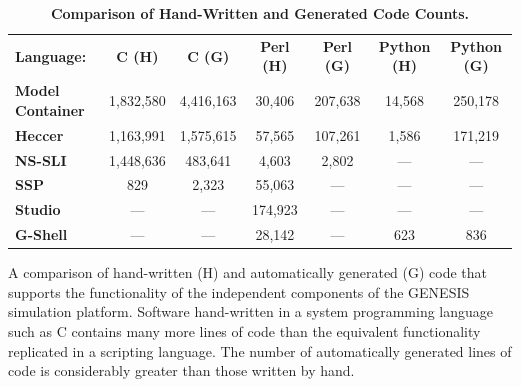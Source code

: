 \documentclass[10pt]{article}
\begin{document}
\begin{table}[ht]
\caption{
\bf{Comparison of Hand-Written and Generated Code Counts.}}
\begin{tabular}{l c c c c c c}

    {\bf Language:}
    & {\bf C (H)}
    & {\bf C (G)}
    & {\bf Perl (H)}
    & {\bf Perl (G)}
    & {\bf Python (H)}
    & {\bf Python (G)} \\

    {\bf Model\,Container}
    & 1,832,580
    & 4,416,163
    & 30,406
    & 207,638
    & 14,568
    & 250,178 \\

    {\bf Heccer}
    & 1,163,991
    & 1,575,615
    & 57,565
    & 107,261
    & 1,586
    & 171,219 \\

    {\bf NS-SLI}
    & 1,448,636
    & 483,641
    & 4,603
    & 2,802
    & ---
    & --- \\

    {\bf SSP}
    & 829
    & 2,323
    & 55,063
    & ---
    & ---
    & --- \\

    {\bf Studio}
    & ---
    & ---
    & 174,923
    & ---
    & ---
    & --- \\

    {\bf G-Shell}
    & ---
    & ---
    & 28,142
    & ---
    & 623
    & 836 \\
\end{tabular}
\begin{flushleft} A comparison of hand-written (H) and automatically generated (G) code that supports the functionality of the independent components of the GENESIS simulation platform. Software hand-written in a system programming language such as C contains many more lines of code than the equivalent functionality replicated in a scripting language. The number of automatically generated lines of code is considerably greater than those written by hand.
\end{flushleft}
\label{tab:cbi-codecounts}
\end{table}

\clearpage

\end{document}
